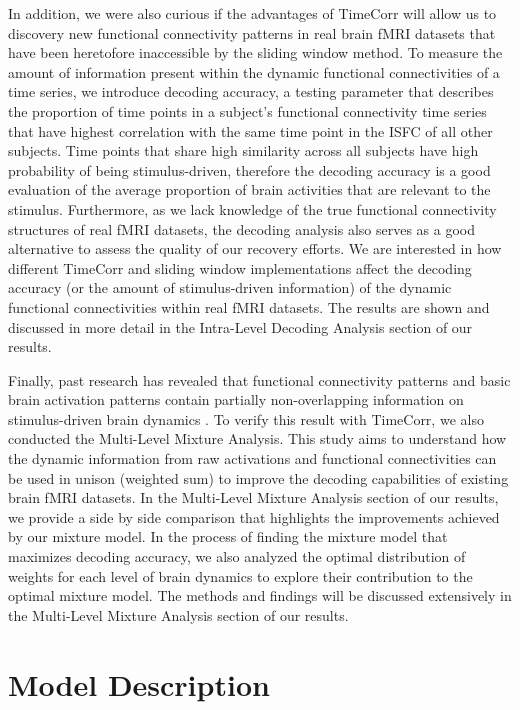 \documentclass[11pt]{article}
\begin{document}
In addition, we were also curious if the advantages of TimeCorr will allow us to discovery new functional connectivity patterns in real brain fMRI datasets that have been heretofore inaccessible by the sliding window method. To measure the amount of information present within the dynamic functional connectivities of a time series, we introduce decoding accuracy, a testing parameter that describes the proportion of time points in a subject's functional connectivity time series that have highest correlation with the same time point in the ISFC of all other subjects. Time points that share high similarity across all subjects have high probability of being stimulus-driven, therefore the decoding accuracy is a good evaluation of the average proportion of brain activities that are relevant to the stimulus. Furthermore, as we lack knowledge of the true functional connectivity structures of real fMRI datasets, the decoding analysis also serves as a good alternative to assess the quality of our recovery efforts. We are interested in how different TimeCorr and sliding window implementations affect the decoding accuracy (or the amount of stimulus-driven information) of the dynamic functional connectivities within real fMRI datasets. The results are shown and discussed in more detail in the Intra-Level Decoding Analysis section of our results.

Finally, past research has revealed that functional connectivity patterns and basic brain activation patterns contain partially non-overlapping information on stimulus-driven brain dynamics \citep{jeremy2017}. To verify this result with TimeCorr, we also conducted the Multi-Level Mixture Analysis. This study aims to understand how the dynamic information from raw activations and functional connectivities can be used in unison (weighted sum) to improve the decoding capabilities of existing brain fMRI datasets. In the Multi-Level Mixture Analysis section of our results, we provide a side by side comparison that highlights the improvements achieved by our mixture model. In the process of finding the mixture model that maximizes decoding accuracy, we also analyzed the optimal distribution of weights for each level of brain dynamics to explore their contribution to the optimal mixture model. The methods and findings will be discussed extensively in the Multi-Level Mixture Analysis section of our results.

\newpage
\section{Model Description}
\end{document}
